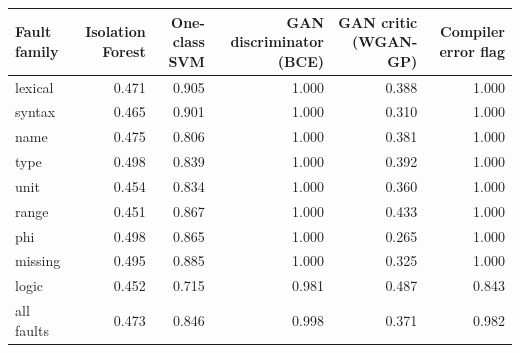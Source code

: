 \begin{tabular}{lrrrrr}
\toprule
\textbf{Fault family} & \textbf{Isolation Forest} & \textbf{One-class SVM} & \textbf{GAN discriminator (BCE)} & \textbf{GAN critic (WGAN-GP)} & \textbf{Compiler error flag}\\
\midrule
lexical & 0.471 & 0.905 & 1.000 & 0.388 & 1.000\\
syntax & 0.465 & 0.901 & 1.000 & 0.310 & 1.000\\
name & 0.475 & 0.806 & 1.000 & 0.381 & 1.000\\
type & 0.498 & 0.839 & 1.000 & 0.392 & 1.000\\
unit & 0.454 & 0.834 & 1.000 & 0.360 & 1.000\\
range & 0.451 & 0.867 & 1.000 & 0.433 & 1.000\\
phi & 0.498 & 0.865 & 1.000 & 0.265 & 1.000\\
missing & 0.495 & 0.885 & 1.000 & 0.325 & 1.000\\
logic & 0.452 & 0.715 & 0.981 & 0.487 & 0.843\\
all faults & 0.473 & 0.846 & 0.998 & 0.371 & 0.982\\\bottomrule
\end{tabular}
